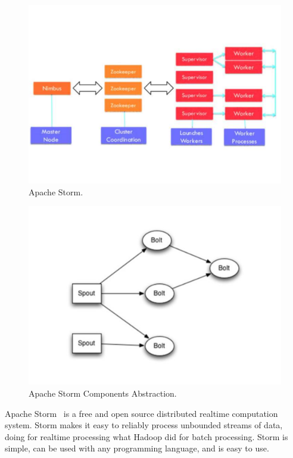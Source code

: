 \begin{figure}
	\centering
	\includegraphics[width=\columnwidth]{Images/apache_storm.pdf}
	\caption[Apache Storm.]{Apache Storm.}
	\label{fig:apache_storm}
\end{figure}
\begin{figure}
	\centering
	\includegraphics[width=\columnwidth]{Images/apache_storm_components_abstraction.pdf}
	\caption[Apache Storm Components Abstraction.]{Apache Storm Components Abstraction.}
	\label{fig:apache_storm_components_abstraction}
\end{figure}

Apache Storm~\cite{misc:ApacheStorm} is a free and open source distributed realtime computation system. Storm makes it easy to reliably process unbounded streams of data, doing for realtime processing what Hadoop did for batch processing. Storm is simple, can be used with any programming language, and is easy to use.

